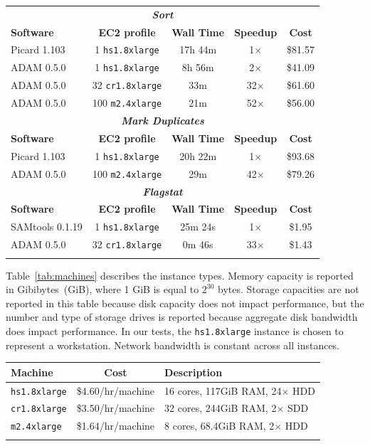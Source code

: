 \documentclass{bioinfo}
\begin{document}
\begin{table}[h]
{\begin{tabular}{ l c c c c }
\toprule
\multicolumn{5}{c}{\bf \textit{Sort}} \\
\bf Software & \bf EC2 profile & \bf Wall Time & \bf Speedup & \bf Cost \\
\midrule
Picard 1.103 & 1 \texttt{hs1.8xlarge} & 17h 44m & 1$\times$ & \$81.57 \\
ADAM 0.5.0 & 1 \texttt{hs1.8xlarge} & 8h 56m & 2$\times$ & \$41.09 \\
ADAM 0.5.0 & 32 \texttt{cr1.8xlarge} & 33m & 32$\times$ & \$61.60 \\
ADAM 0.5.0 & 100 \texttt{m2.4xlarge} & 21m & 52$\times$ & \$56.00 \\ 
\midrule
\multicolumn{5}{c}{\bf \textit{Mark Duplicates}} \\
\bf Software & \bf EC2 profile & \bf Wall Time & \bf Speedup & \bf Cost  \\
\midrule
Picard 1.103 & 1 \texttt{hs1.8xlarge} & 20h 22m & 1$\times$ & \$93.68 \\
ADAM 0.5.0 & 100 \texttt{m2.4xlarge} & 29m & 42$\times$ & \$79.26 \\
\midrule
\multicolumn{5}{c}{\bf \textit{Flagstat}} \\
\bf Software & \bf EC2 profile & \bf Wall Time & \bf Speedup & \bf Cost  \\
\midrule
SAMtools 0.1.19 & 1 \texttt{hs1.8xlarge} & 25m 24s & 1$\times$ & \$1.95 \\
ADAM 0.5.0 & 32 \texttt{cr1.8xlarge} & 0m 46s & 33$\times$ & \$1.43 \\
\botrule
\end{tabular}}{}
\end{table}

Table~\ref{tab:machines} describes the instance types. Memory capacity is reported in Gibibytes~(GiB), where 1 GiB is equal to $2^{30}$ bytes. Storage
capacities are not reported in this table because disk capacity does not impact performance, but the number and type of storage drives is reported because aggregate
disk bandwidth does impact performance. In our tests, the \texttt{hs1.8xlarge} instance is chosen to represent a workstation. Network bandwidth is constant across all instances.

\begin{table}[h]
{\begin{tabular}{ l c l }
\toprule
\bf Machine & \bf Cost & \bf Description \\
\midrule
\texttt{hs1.8xlarge} & \$4.60/hr/machine & 16 cores, 117GiB RAM, 24$\times$ HDD \\
\texttt{cr1.8xlarge} & \$3.50/hr/machine & 32 cores, 244GiB RAM, 2$\times$ SDD \\
\texttt{m2.4xlarge} & \$1.64/hr/machine & 8 cores, 68.4GiB RAM, 2$\times$ HDD \\
\botrule
\end{tabular}}{}
\end{table}
\end{document}
